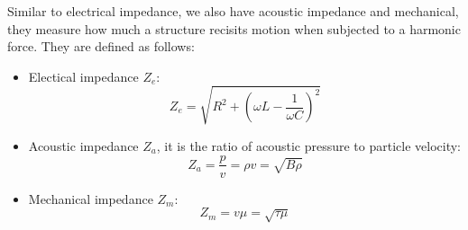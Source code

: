 \documentclass[11pt]{report}
\begin{document}
\begin{definition}[Impedance]
    Similar to electrical impedance, we also have acoustic impedance and mechanical, they measure how much a structure recisits motion when subjected to a harmonic force. They are defined as follows:
    \begin{itemize}
        \item Electical impedance \( Z_e \):
        \begin{equation}
            Z_e = \sqrt{R^2 + \left(\omega L - \frac{1}{\omega C}\right)^2}
        \end{equation}
        \item Acoustic impedance \( Z_a \), it is the ratio of acoustic pressure to particle velocity:
        \begin{equation}
            Z_a = \frac{p}{v} = \rho v = \sqrt{B\rho}
        \end{equation}
        \item Mechanical impedance \( Z_m \):
        \begin{equation}
            Z_m = v\mu = \sqrt{\tau\mu}
        \end{equation}
    \end{itemize}
\end{definition}
\end{document}
